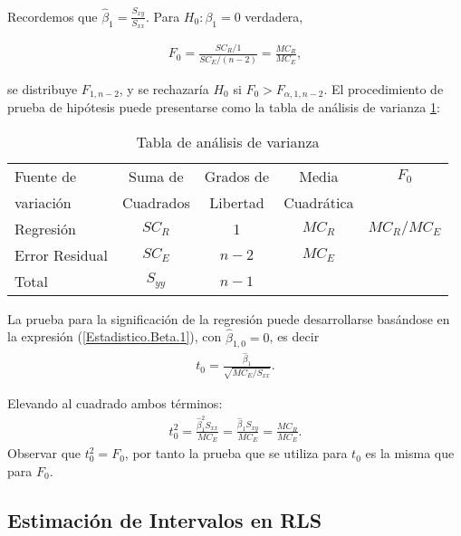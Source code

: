 \documentclass[12pt]{article}
\begin{document}
Recordemos que $\hat{\beta}_{1}=\frac{S_{xy}}{S_{xx}}$. Para $H_{0}:\beta_{1}=0$ verdadera,

\begin{eqnarray*}
F_{0}=\frac{SC_{R}/1}{SC_{E}/(n-2)}=\frac{MC_{R}}{MC_{E}},
\end{eqnarray*}

se distribuye $F_{1,n-2}$, y se rechazar\'ia $H_{0}$ si $F_{0}>F_{\alpha,1,n-2}$. El procedimiento de prueba de hip\'otesis puede presentarse como la tabla de an\'alisis de varianza \ref{Tabla.Analisis.Varianza}:

\begin{table}[htbp]
\centering
\caption{Tabla de análisis de varianza}
\label{Tabla.Analisis.Varianza}
\begin{tabular}{lcccc}
\hline
Fuente de & Suma de  &  Grados de  & Media  & $F_{0}$ \\ 
variación & Cuadrados & Libertad & Cuadrática & \\
\hline
Regresión & $SC_{R}$ & 1 & $MC_{R}$  & $MC_{R}/MC_{E}$\\
Error Residual & $SC_{E}$ & $n-2$ & $MC_{E}$ & \\
\hline
Total & $S_{yy}$ & $n-1$ & & \\
\hline
\end{tabular}
\end{table}


\medskip

La prueba para la significaci\'on de la regresi\'on puede desarrollarse bas\'andose en la expresi\'on (\ref{Estadistico.Beta.1}), con $\hat{\beta}_{1,0}=0$, es decir
\begin{eqnarray*}%
t_{0}=\frac{\hat{\beta}_{1}}{\sqrt{MC_{E}/S_{xx}}}.
\end{eqnarray*}

Elevando al cuadrado ambos t\'erminos:
\begin{eqnarray*}
t_{0}^{2}=\frac{\hat{\beta}_{1}^{2}S_{xx}}{MC_{E}}=\frac{\hat{\beta}_{1}S_{xy}}{MC_{E}}=\frac{MC_{R}}{MC_{E}}.
\end{eqnarray*}
Observar que $t_{0}^{2}=F_{0}$, por tanto la prueba que se utiliza para $t_{0}$ es la misma que para $F_{0}$.

\subsection{Estimaci\'on de Intervalos en RLS}
\end{document}
